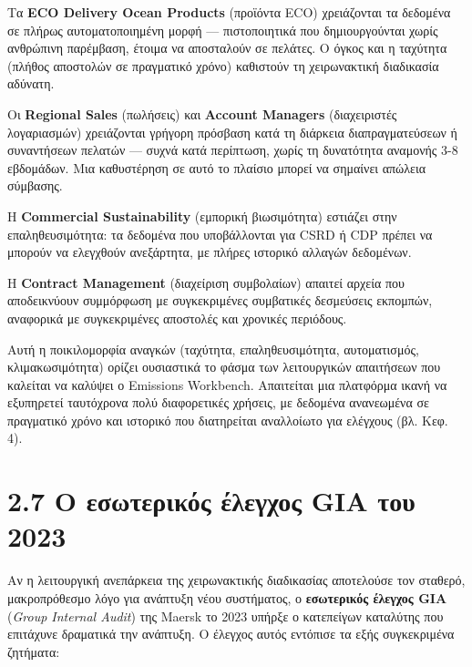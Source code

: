 \documentclass[11pt,a4paper,greek,twoside]{template-xe}
\begin{document}
Τα \textbf{ECO Delivery Ocean Products} (προϊόντα ECO) χρειάζονται τα
δεδομένα σε πλήρως αυτοματοποιημένη μορφή --- πιστοποιητικά που
δημιουργούνται χωρίς ανθρώπινη παρέμβαση, έτοιμα να αποσταλούν σε
πελάτες. Ο όγκος και η ταχύτητα (πλήθος αποστολών σε πραγματικό χρόνο)
καθιστούν τη χειρωνακτική διαδικασία αδύνατη.

Οι \textbf{Regional Sales} (πωλήσεις) και \textbf{Account Managers}
(διαχειριστές λογαριασμών) χρειάζονται γρήγορη πρόσβαση κατά τη διάρκεια
διαπραγματεύσεων ή συναντήσεων πελατών --- συχνά κατά περίπτωση, χωρίς
τη δυνατότητα αναμονής 3-8 εβδομάδων. Μια καθυστέρηση σε αυτό το πλαίσιο
μπορεί να σημαίνει απώλεια σύμβασης.

Η \textbf{Commercial Sustainability} (εμπορική βιωσιμότητα) εστιάζει
στην επαληθευσιμότητα: τα δεδομένα που υποβάλλονται για CSRD ή CDP
πρέπει να μπορούν να ελεγχθούν ανεξάρτητα, με πλήρες ιστορικό αλλαγών
δεδομένων.

Η \textbf{Contract Management} (διαχείριση συμβολαίων) απαιτεί αρχεία
που αποδεικνύουν συμμόρφωση με συγκεκριμένες συμβατικές δεσμεύσεις
εκπομπών, αναφορικά με συγκεκριμένες αποστολές και χρονικές περιόδους.

Αυτή η ποικιλομορφία αναγκών (ταχύτητα, επαληθευσιμότητα, αυτοματισμός,
κλιμακωσιμότητα) ορίζει ουσιαστικά το φάσμα των λειτουργικών απαιτήσεων
που καλείται να καλύψει ο Emissions Workbench. Απαιτείται μια πλατφόρμα
ικανή να εξυπηρετεί ταυτόχρονα πολύ διαφορετικές χρήσεις, με δεδομένα
ανανεωμένα σε πραγματικό χρόνο και ιστορικό που διατηρείται αναλλοίωτο
για ελέγχους (βλ. Κεφ. 4).

\section{2.7 Ο εσωτερικός έλεγχος GIA του
2023}\label{ux3bf-ux3b5ux3c3ux3c9ux3c4ux3b5ux3c1ux3b9ux3baux3ccux3c2-ux3adux3bbux3b5ux3b3ux3c7ux3bfux3c2-gia-ux3c4ux3bfux3c5-2023}

Αν η λειτουργική ανεπάρκεια της χειρωνακτικής διαδικασίας αποτελούσε τον
σταθερό, μακροπρόθεσμο λόγο για ανάπτυξη νέου συστήματος, ο
\textbf{εσωτερικός έλεγχος GIA} (\emph{Group Internal Audit}) της Maersk
το 2023 υπήρξε ο κατεπείγων καταλύτης που επιτάχυνε δραματικά την
ανάπτυξη. Ο έλεγχος αυτός εντόπισε τα εξής συγκεκριμένα ζητήματα:
\end{document}
